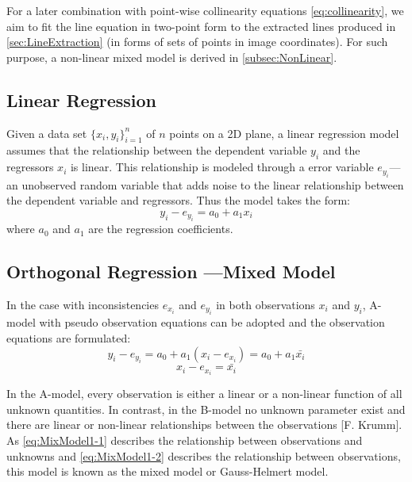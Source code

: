 For a later combination with point-wise collinearity equations \eqref{eq:collinearity}, we aim to fit the line equation in two-point form to the extracted lines produced in \cref{sec:LineExtraction} (in forms of sets of points in image coordinates). For such purpose, a non-linear mixed model is derived in \cref{subsec:NonLinear}. 


\subsection{Linear Regression}
\label{subsec:LinearRegression}

Given a data set $\{x_i,y_i\}^n_{i=1}$ of $n$ points on a 2D plane, a linear regression model assumes that the relationship between the dependent variable $y_i$ and the regressors $x_i$ is linear. This relationship is modeled through a error variable $e_{y_i}$--- an unobserved random variable that adds noise to the linear relationship between the dependent variable and regressors.
Thus the model takes the form:
\begin{equation} \label{eq:SimpleLinearRegression}
y_i - e_{y_i} = a_0 + a_1x_i
\end{equation}
where $a_0$ and $a_1$ are the regression coefficients.


\subsection{Orthogonal Regression ---Mixed Model}
\label{subsec:MixedModel}

In the case with inconsistencies $e_{x_i}$ and $e_{y_i}$ in both observations $x_i$ and $y_i$, A-model with pseudo observation equations can be adopted and the observation equations are formulated:
\begin{equation} \label{eq:MixModel1-1}
y_i - e_{y_i} = a_0 + a_1(x_i-e_{x_i}) = a_0 + a_1\bar{x_i}
\end{equation}
\begin{equation} \label{eq:MixModel1-2}
x_i-e_{x_i} = \bar{x_i}
\end{equation}

In the A-model, every observation is either a linear or a non-linear function of all unknown quantities. In contrast, in the B-model no unknown parameter exist and there are linear or non-linear relationships between the observations [F. Krumm]. As \eqref{eq:MixModel1-1} describes the relationship between observations and unknowns and \eqref{eq:MixModel1-2} describes the relationship between observations, this model is known as the mixed model or Gauss-Helmert model.




